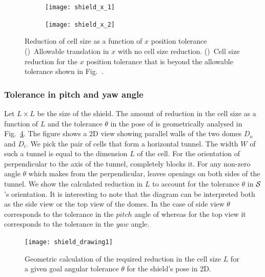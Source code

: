 \documentclass[a4paper]{report}
\begin{document}
\begin{figure}[t]
    \centering
    \begin{subfigure}{0.48\textwidth}
        \texttt{[image: shield\_x\_1]}
        \caption{}
        \label{fig:shield5a}
    \end{subfigure} 
    \begin{subfigure}{0.48\textwidth}
        \texttt{[image: shield\_x\_2]}
        \caption{}
        \label{fig:shield5b}
    \end{subfigure}
    \caption{
    Reduction of cell size as a function of $x$ position tolerance 
     ()~Allowable translation in $x$ with no cell size reduction.
    ()~Cell size reduction for the $x$ position tolerance that is beyond the allowable tolerance shown in Fig.~.
    }
\label{fig:shield5}
\end{figure}

\subsubsection{Tolerance in pitch and yaw angle}
Let $L \times L$  be the size of the shield. The amount of reduction in the cell size as a function of $L$ and the tolerance $\theta$ in the pose of \calS is geometrically analysed in Fig.~\ref{fig:shield1}. The figure shows a 2D view showing parallel walls of the two domes $D_o$ and $D_i$. We pick the pair of cells that form a horizontal tunnel.
The width $W$ of such a tunnel is equal to the dimension $L$ of the cell. For the orientation of \calS perpendicular to the axis of the tunnel, \calS completely blocks it. For any non-zero angle $\theta$ which \calS makes from the perpendicular, \calS leaves openings on both sides of the tunnel.
We show the calculated reduction in $L$ to account for the tolerance $\theta$ in $\mathcal{S}$'s orientation. It is interesting to note that the diagram can be interpreted both as the side view or the top view of the domes.
In the case of side view $\theta$ corresponds to the tolerance in the $pitch$ angle of \calS whereas for the top view it corresponds to the tolerance in the $yaw$ angle.

\begin{figure}[bt]
\centering
\texttt{[image: shield\_drawing1]}
\caption{Geometric calculation of the required reduction in the cell size $L$ for a given goal angular tolerance $\theta$ for the shield's pose in 2D.}
\label{fig:shield1}
\end{figure}
\end{document}
